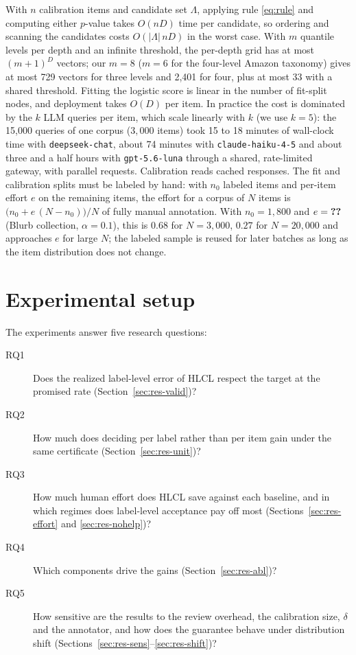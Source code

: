 \documentclass[preprint,12pt]{elsarticle}
\theoremstyle{definition}
\newcommand{\hlcl}{\textup{\textsc{HLCL}}}
\begin{document}
With $n$ calibration items and candidate set $\Lambda$, applying rule
\eqref{eq:rule} and computing either $p$-value takes $O(nD)$ time per
candidate, so ordering and scanning the candidates costs $O(|\Lambda|\,nD)$ in
the worst case. With $m$ quantile levels per
depth and an infinite threshold, the per-depth grid has at most $(m+1)^D$
vectors; our $m=8$ ($m=6$ for the four-level Amazon taxonomy) gives at most 729
vectors for three levels and 2,401 for four, plus at most 33 with a shared
threshold. Fitting the logistic score is linear in the number of fit-split
nodes, and deployment takes $O(D)$ per item. In practice the cost is dominated by the $k$
LLM queries per item, which scale linearly with $k$ (we use $k=5$): the 15,000
queries of one corpus ($3{,}000$ items) took 15 to 18 minutes of wall-clock
time with \texttt{deepseek-chat}, about 74 minutes with
\texttt{claude-haiku-4-5} and about three and a half hours with
\texttt{gpt-5.6-luna} through a shared, rate-limited gateway, with parallel
requests. Calibration reads cached responses. The fit and calibration splits
must be labeled by hand: with $n_0$ labeled items and per-item effort $e$ on the
remaining items, the effort for a corpus of $N$ items is
$\bigl(n_0+e\,(N-n_0)\bigr)/N$ of fully manual annotation. With $n_0=1{,}800$
and $e=\res{bgc}{0.1}{HLCL}{effort}$ (Blurb collection, $\alpha=0.1$), this is
$0.68$ for $N=3{,}000$, $0.27$ for $N=20{,}000$ and approaches $e$ for large
$N$; the labeled sample is reused for later batches as long as the item
distribution does not change.

\section{Experimental setup}
\label{sec:setup}

The experiments answer five research questions:
\begin{description}
  \item[RQ1] Does the realized label-level error of \hlcl{} respect the target
  at the promised rate (Section~\ref{sec:res-valid})?
  \item[RQ2] How much does deciding per label rather than per item gain under
  the same certificate (Section~\ref{sec:res-unit})?
  \item[RQ3] How much human effort does \hlcl{} save against each baseline,
  and in which regimes does label-level acceptance pay off most
  (Sections~\ref{sec:res-effort} and \ref{sec:res-nohelp})?
  \item[RQ4] Which components drive the gains (Section~\ref{sec:res-abl})?
    \item[RQ5] How sensitive are the results to the review overhead, the
  calibration size, $\delta$ and the annotator, and how does the guarantee
  behave under distribution shift
  (Sections~\ref{sec:res-sens}--\ref{sec:res-shift})?
\end{description}
\end{document}
